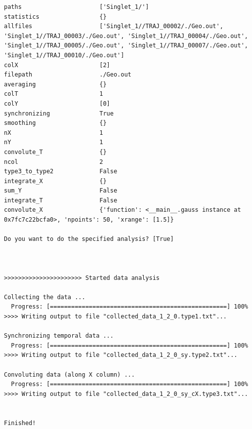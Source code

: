 \documentclass[a4paper,11pt,DIV=15,openany]{scrbook}
\begin{document}
\begin{oframed}
\begin{Verbatim}[commandchars=\\\{\}]
paths                      ['Singlet_1/']
statistics                 {}
allfiles                   ['Singlet_1//TRAJ_00002/./Geo.out', 'Singlet_1//TRAJ_00003/./Geo.out', 'Singlet_1//TRAJ_00004/./Geo.out', 'Singlet_1//TRAJ_00005/./Geo.out', 'Singlet_1//TRAJ_00007/./Geo.out', 'Singlet_1//TRAJ_00010/./Geo.out']
colX                       [2]
filepath                   ./Geo.out
averaging                  {}
colT                       1
colY                       [0]
synchronizing              True
smoothing                  {}
nX                         1
nY                         1
convolute_T                {}
ncol                       2
type3_to_type2             False
integrate_X                {}
sum_Y                      False
integrate_T                False
convolute_X                {'function': <__main__.gauss instance at 0x7fc7c22bcfa0>, 'npoints': 50, 'xrange': [1.5]}

Do you want to do the specified analysis? [True] 



>>>>>>>>>>>>>>>>>>>>>> Started data analysis

Collecting the data ...
  Progress: [==================================================] 100%
>>>> Writing output to file "collected_data_1_2_0.type1.txt"...

Synchronizing temporal data ...
  Progress: [==================================================] 100%
>>>> Writing output to file "collected_data_1_2_0_sy.type2.txt"...

Convoluting data (along X column) ...
  Progress: [==================================================] 100%
>>>> Writing output to file "collected_data_1_2_0_sy_cX.type3.txt"...


Finished!
\end{Verbatim}
\end{oframed}
\end{document}
